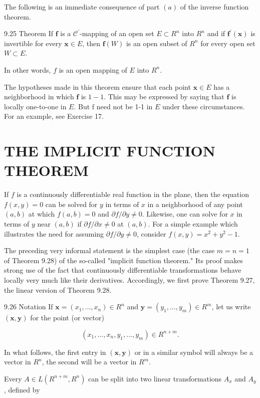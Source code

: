 \documentclass[10pt]{article}
\begin{document}
The following is an immediate consequence of part $(a)$ of the inverse function theorem.

9.25 Theorem If $\mathbf{f}$ is a $\mathscr{C}^{\prime}$-mapping of an open set $E \subset R^{n}$ into $R^{n}$ and if $\mathbf{f}^{\prime}(\mathbf{x})$ is invertible for every $\mathbf{x} \in E$, then $\mathbf{f}(W)$ is an open subset of $R^{n}$ for every open set $W \subset E$.

In other words, $f$ is an open mapping of $E$ into $R^{n}$.

The hypotheses made in this theorem ensure that each point $\mathbf{x} \in E$ has a neighborhood in which $\mathbf{f}$ is $1-1$. This may be expressed by saying that $\mathbf{f}$ is locally one-to-one in $E$. But $\mathrm{f}$ need not be 1-1 in $E$ under these circumstances. For an example, see Exercise 17.

\section{THE IMPLICIT FUNCTION THEOREM}
If $f$ is a continuously differentiable real function in the plane, then the equation $f(x, y)=0$ can be solved for $y$ in terms of $x$ in a neighborhood of any point $(a, b)$ at which $f(a, b)=0$ and $\partial f / \partial y \neq 0$. Likewise, one can solve for $x$ in terms of $y$ near $(a, b)$ if $\partial f / \partial x \neq 0$ at $(a, b)$. For a simple example which illustrates the need for assuming $\partial f / \partial y \neq 0$, consider $f(x, y)=x^{2}+y^{2}-1$.

The preceding very informal statement is the simplest case (the case $m=n=1$ of Theorem 9.28) of the so-called "implicit function theorem." Its proof makes strong use of the fact that continuously differentiable transformations behave locally very much like their derivatives. Accordingly, we first prove Theorem 9.27, the linear version of Theorem 9.28.

9.26 Notation If $\mathbf{x}=\left(x_{1}, \ldots, x_{n}\right) \in R^{n}$ and $\mathbf{y}=\left(y_{1}, \ldots, y_{m}\right) \in R^{m}$, let us write $(\mathbf{x}, \mathbf{y})$ for the point (or vector)

$$
\left(x_{1}, \ldots, x_{n}, y_{1}, \ldots, y_{m}\right) \in R^{n+m} .
$$

In what follows, the first entry in $(\mathbf{x}, \mathbf{y})$ or in a similar symbol will always be a vector in $R^{n}$, the second will be a vector in $R^{m}$.

Every $A \in L\left(R^{n+m}, R^{n}\right)$ can be split into two linear transformations $A_{x}$ and $A_{y}$, defined by
\end{document}
